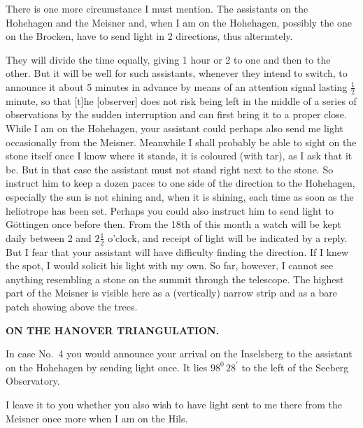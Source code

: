 \par\noindent\hspace*{\parindent}There is one more circumstance I must mention.
The assistants on the Hohehagen and the Meisner and, when I am on the Hohehagen, possibly the one on the Brocken, have to send light in 2 directions, thus alternately.
\par\noindent\hspace*{\parindent}They will divide the time equally, giving 1 hour or 2 to one and then to the other.
But it will be well for such assistants, whenever they intend to switch, to announce it about 5 minutes in advance by means of an attention signal lasting \(\frac{1}{2}\) minute, so that [t]he [observer] does not risk being left in the middle of a series of observations by the sudden interruption and can first bring it to a proper close.
While I am on the Hohehagen, your assistant could perhaps also send me light occasionally from the Meisner.
Meanwhile I shall probably be able to sight on the stone itself once I know where it stands,  it is coloured  (with tar), as I ask that it be.
But in that case the assistant must not stand right next to the stone.
So instruct him to keep a dozen paces to one side of the direction to the Hohehagen, especially  the sun is not shining and, when it is shining, each time as soon as the heliotrope has been set.
Perhaps you could also instruct him to send light to Göttingen once before then.
From the 18th of this month a watch will be kept daily between 2 and \(2\frac{1}{2}\) o'clock, and receipt of light will be indicated by a reply.
But I fear that your assistant will have difficulty finding the direction.
If I knew the spot, I would solicit his light with my own.
So far, however, I cannot see anything resembling a stone on the summit through the telescope.
The highest part of the Meisner is visible here as a (vertically) narrow strip and as a bare patch showing above the trees.
\par\clearpage
\noindent\null\hfill{\small\textbf{ON THE HANOVER TRIANGULATION.}}\hfill{}\par\medskip
\par\noindent\hspace*{\parindent}In case No.~4 you would announce your arrival on the Inselsberg to the assistant on the Hohehagen by sending light once.
It lies \(98^{0}\,28^{\prime}\) to the left of the Seeberg Observatory.
\par\noindent\hspace*{\parindent}I leave it to you whether you also wish to have light sent to me there from the Meisner once more when I am on the Hils.
